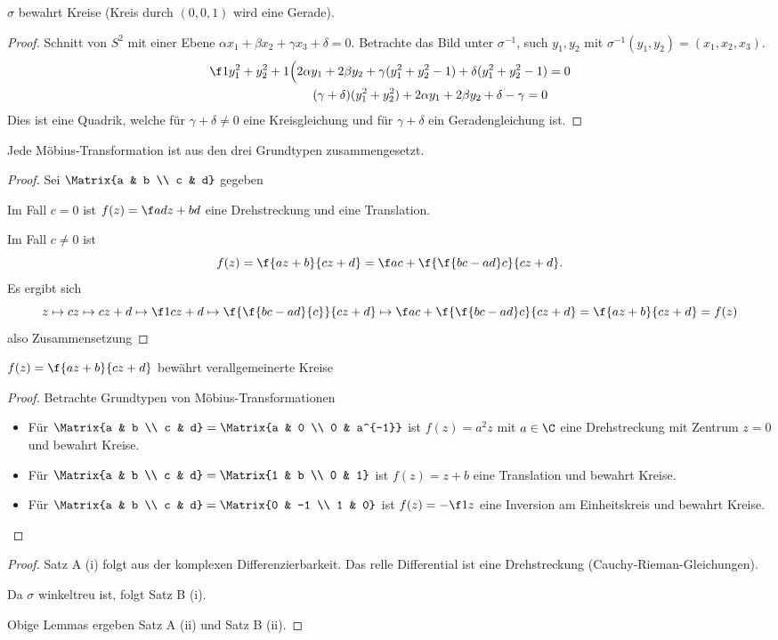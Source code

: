 \begin{lem}
	$\sigma$ bewahrt Kreise (Kreis durch $(0,0,1)$ wird eine Gerade).
	\begin{proof}
		Schnitt von $S^2$ mit einer Ebene $\alpha x_1 + \beta x_2 + \gamma x_3 + \delta = 0$.
		Betrachte das Bild unter $\sigma^{-1}$, such $y_1, y_2$ mit $\sigma^{-1}(y_1, y_2) = (x_1, x_2, x_3)$.
		\begin{align*}
			\f 1{y_1^2 + y_2^2 + 1} \Big( 2 \alpha y_1 + 2 \beta y_2 + \gamma (y_1^2 + y_2^2 - 1) + \delta (y_1^2 + y_2^2 - 1) &= 0 \\
			(\gamma + \delta)(y_1^2 + y_2^2) + 2 \alpha y_1 + 2 \beta y_2 + \delta - \gamma = 0
		\end{align*}
		Dies ist eine Quadrik, welche für $\gamma + \delta \neq 0$ eine Kreisgleichung und für $\gamma + \delta$ ein Geradengleichung ist.
	\end{proof}
\end{lem}

\begin{lem}
	Jede Möbius-Transformation ist aus den drei Grundtypen zusammengesetzt.
	\begin{proof}
		Sei $\Matrix{a & b \\ c & d}$ gegeben

		Im Fall $c = 0$ ist $f(z) = \f a d z + bd$ eine Drehstreckung und eine Translation.

		Im Fall $c \neq 0$ ist
		\[
			f(z) = \f {az + b}{cz + d}
			= \f ac + \f {\f {bc - ad}c}{cz + d}.
		\]
		Es ergibt sich
		\[
			z \mapsto c z \mapsto c z + d \mapsto \f 1{cz + d} \mapsto \f{\f{bc - ad}{c}}{cz + d} \mapsto \f ac + \f{\f{bc-ad}c}{cz+d} = \f {az + b}{cz + d} = f(z)
		\]
		also Zusammensetzung
	\end{proof}
\end{lem}

\begin{lem}
	$f(z) = \f {az + b} {cz + d}$ bewährt verallgemeinerte Kreise
	\begin{proof}
		Betrachte Grundtypen von Möbius-Transformationen
		\begin{itemize}
			\item
				Für $\Matrix{a & b \\ c & d} = \Matrix{a & 0 \\ 0 & a^{-1}}$ ist $f(z) = a^2 z$ mit $a \in \C$ eine Drehstreckung mit Zentrum $z=0$ und bewahrt Kreise.
			\item
				Für $\Matrix{a & b \\ c & d} = \Matrix{1 & b \\ 0 & 1}$ ist $f(z) = z + b$ eine Translation und bewahrt Kreise.
			\item
				Für $\Matrix{a & b \\ c & d} = \Matrix{0 & -1 \\ 1 & 0}$ ist $f(z) = - \f 1z$ eine Inversion am Einheitskreis und bewahrt Kreise.
		\end{itemize}
	\end{proof}
\end{lem}

\begin{proof}
	Satz A (i) folgt aus der komplexen Differenzierbarkeit.
	Das relle Differential ist eine Drehstreckung (Cauchy-Rieman-Gleichungen).

	Da $\sigma$ winkeltreu ist, folgt Satz B (i).

	Obige Lemmas ergeben Satz A (ii) und Satz B (ii).
\end{proof}


